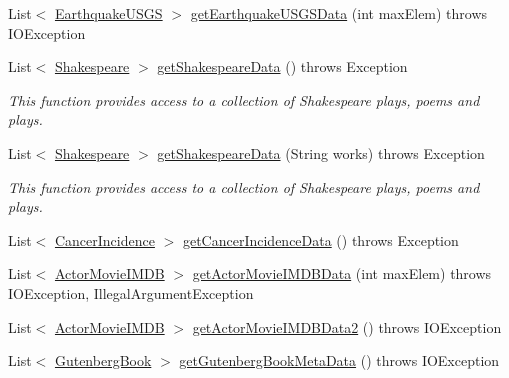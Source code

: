 \begin{DoxyCompactItemize}
\item 
List$<$ \hyperlink{classbridges_1_1data__src__dependent_1_1_earthquake_u_s_g_s}{Earthquake\+U\+S\+GS} $>$ \hyperlink{classbridges_1_1connect_1_1_data_source_af49a5212ae2bb6eed4501152276b79ad}{get\+Earthquake\+U\+S\+G\+S\+Data} (int max\+Elem)  throws I\+O\+Exception 
\item 
List$<$ \hyperlink{classbridges_1_1data__src__dependent_1_1_shakespeare}{Shakespeare} $>$ \hyperlink{classbridges_1_1connect_1_1_data_source_af2b6e5df074d0a689e8a992b1bea6f3e}{get\+Shakespeare\+Data} ()  throws Exception 
\begin{DoxyCompactList}\small\item\em This function provides access to a collection of Shakespeare plays, poems and plays. \end{DoxyCompactList}\item 
List$<$ \hyperlink{classbridges_1_1data__src__dependent_1_1_shakespeare}{Shakespeare} $>$ \hyperlink{classbridges_1_1connect_1_1_data_source_a04aa757c45139e52525d4b09156abfe1}{get\+Shakespeare\+Data} (String works)  throws Exception 
\begin{DoxyCompactList}\small\item\em This function provides access to a collection of Shakespeare plays, poems and plays. \end{DoxyCompactList}\item 
List$<$ \hyperlink{classbridges_1_1data__src__dependent_1_1_cancer_incidence}{Cancer\+Incidence} $>$ \hyperlink{classbridges_1_1connect_1_1_data_source_a7617a81fe00361c3ae6fed5873739aa2}{get\+Cancer\+Incidence\+Data} ()  throws Exception 
\item 
List$<$ \hyperlink{classbridges_1_1data__src__dependent_1_1_actor_movie_i_m_d_b}{Actor\+Movie\+I\+M\+DB} $>$ \hyperlink{classbridges_1_1connect_1_1_data_source_ab18803b850f3c867306723d1a1be337e}{get\+Actor\+Movie\+I\+M\+D\+B\+Data} (int max\+Elem)  throws I\+O\+Exception, Illegal\+Argument\+Exception 
\item 
List$<$ \hyperlink{classbridges_1_1data__src__dependent_1_1_actor_movie_i_m_d_b}{Actor\+Movie\+I\+M\+DB} $>$ \hyperlink{classbridges_1_1connect_1_1_data_source_ae44e4ed7879e2755f8c66a335d8b6ad5}{get\+Actor\+Movie\+I\+M\+D\+B\+Data2} ()  throws I\+O\+Exception 
\item 
List$<$ \hyperlink{classbridges_1_1data__src__dependent_1_1_gutenberg_book}{Gutenberg\+Book} $>$ \hyperlink{classbridges_1_1connect_1_1_data_source_aff3adc9d08624062469315f2fe059044}{get\+Gutenberg\+Book\+Meta\+Data} ()  throws I\+O\+Exception 

\end{DoxyCompactItemize}
